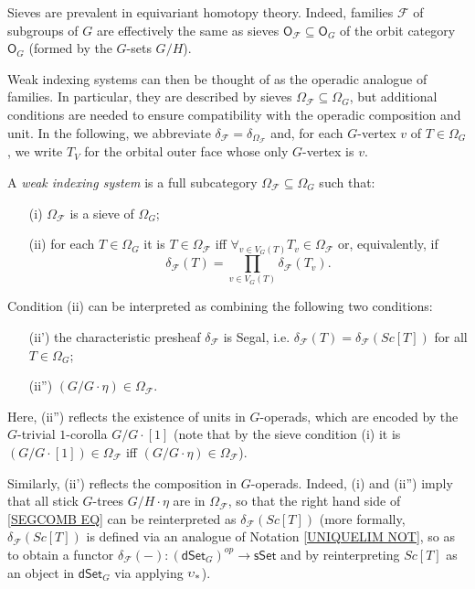 \documentclass[a4paper,10pt
,draft
]{article}%
\begin{document}
Sieves are prevalent in equivariant homotopy theory. Indeed, families $\mathcal{F}$ of subgroups of $G$ are effectively the same as sieves $\mathsf{O}_{\mathcal{F}} \subseteq \mathsf{O}_G$
of the orbit category
$\mathsf{O}_G$ (formed by the $G$-sets $G/H$).

Weak indexing systems can then be thought of as the operadic analogue of families. In particular, they are described by sieves $\Omega_{\mathcal{F}} \subseteq \Omega_G$,
but additional conditions are needed to ensure compatibility 
with the operadic composition and unit.
In the following, we abbreviate 
$\delta_{\mathcal{F}} = \delta_{\Omega_{\mathcal{F}}}$ and,
for each $G$-vertex $v$ of $T \in \Omega_G$, we write 
$T_V$ for the orbital outer face whose only
$G$-vertex is $v$.

\begin{definition}
A \textit{weak indexing system} is a full subcategory
$\Omega_{\mathcal{F}} \subseteq \Omega_G$ such that:
\begin{itemize}
	\item[(i)] $\Omega_{\mathcal{F}}$ is a sieve of 
              $\Omega_G$;              
	\item[(ii)] for each $T \in \Omega_G$ it is 
	$T \in \Omega_{\mathcal{F}}$ iff 
	$\forall_{v \in V_G(T)} T_v \in \Omega_{\mathcal{F}}$
	or, equivalently, if
\begin{equation}\label{SEGCOMB EQ}
\delta_{\mathcal{F}}(T) =
\prod_{v \in V_G(T)}\delta_{\mathcal{F}}(T_v).
\end{equation}
\end{itemize}
\end{definition}


\begin{remark}\label{SEGCOMB REM}
	Condition (ii) can be interpreted as combining the following two conditions:
\begin{itemize}
	\item[(ii')] the characteristic presheaf $\delta_{\mathcal{F}}$ is Segal, i.e. 
	$\delta_{\mathcal{F}}(T) = 
	\delta_{\mathcal{F}}(Sc[T])$
	for all $T \in \Omega_G$;
	\item[(ii'')] $(G/G \cdot \eta) \in \Omega_{\mathcal{F}}$.
\end{itemize}

Here, (ii'') reflects the existence of units in $G$-operads,
which are encoded by the
$G$-trivial $1$-corolla $G/G\cdot [1]$
(note that by the sieve condition (i) it is
$(G/G\cdot [1]) \in \Omega_{\mathcal{F}}$
iff 
$(G/G\cdot \eta) \in \Omega_{\mathcal{F}}$).

Similarly, (ii') reflects the composition in $G$-operads.
Indeed, (i) and (ii'') imply that
all stick $G$-trees $G/H \cdot \eta$ are in 
$\Omega_{\mathcal{F}}$,
so that the right hand side of \eqref{SEGCOMB EQ}
can be reinterpreted as $\delta_{\mathcal{F}}(Sc[T])$
(more formally, $\delta_{\mathcal{F}}(Sc[T])$ is defined via an analogue of 
Notation \ref{UNIQUELIM NOT}, 
so as to obtain a functor
$\delta_{\mathcal{F}}(-) \colon 
(\mathsf{dSet}_G)^{op} \to \mathsf{sSet}$ 
and by reinterpreting $Sc[T]$ as an object in 
$\mathsf{dSet}_G$ via applying $\upsilon_{\**}$).
\end{remark}
\end{document}
